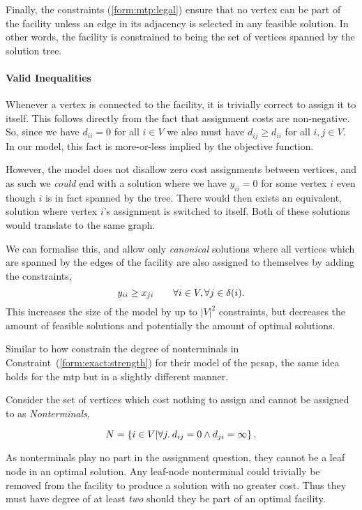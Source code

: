  Finally, the constraints (\ref{form:mtp:legal}) ensure that no vertex can be part
 of the facility unless an edge in its adjacency is selected in any feasible solution.
 In other words, the facility is constrained to being
 the set of vertices spanned by the solution tree.

 \paragraph{Valid Inequalities}
 Whenever a vertex is connected to the facility, it is trivially correct to assign it to itself.
 This follows directly from the fact that assignment costs are non-negative.
 So, since we have $d_{ii} = 0$
 for all $i \in V$
 we also must have $d_{ij} \geq d_{ii}$
 for all $i,j \in V$.
 In our model, this fact is more-or-less implied by the objective function.
 
 However, the model does not disallow zero cost assignments between
 vertices, and as such we \textit{could} end with a solution where we have $y_{ii} = 0$ for some
 vertex $i$ even though $i$ is in fact spanned by the tree. There would then exists an equivalent,
 solution where vertex $i$'s assignment is switched to itself. Both of these solutions would translate
 to the same graph.

 We can formalise this, and allow only \textit{canonical} solutions where all vertices
 which are spanned by the edges of the facility are also assigned to themselves by
 adding the constraints,
 \begin{equation}\label{form:mtp:str}
 y_{ii} \geq x_{ji} \qquad \forall i \in V,  \forall j \in \delta(i)\mathnormal{.}
\end{equation}
This increases the size of the model by up to $|V|^2$ constraints, but
decreases the amount of feasible solutions and potentially the amount of optimal solutions.
\smallskip

Similar to how \citet{ljubic2005solving} constrain the degree of nonterminals in
Constraint~(\ref{form:exact:strength}) for their model of the \gls{pcsap},
the same idea holds for the \gls{mtp} but in a slightly different manner.

 Consider the set of vertices which cost nothing to assign and cannot be assigned to as \textit{Nonterminals},

 \[N = \left\{ i \in V \middle\vert \forall j.\: d_{ij} = 0 \wedge   d_{ji} = \infty\right\}\mathnormal{.}\]

 As nonterminals play no part in the assignment question,
 they cannot be a leaf node in an optimal solution.
 Any leaf-node nonterminal could trivially
 be removed from the facility to produce a solution with no greater cost.
 Thus they must have degree of at least
 \textit{two} should they be part of an optimal facility.

